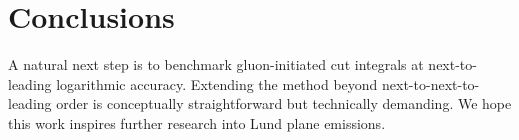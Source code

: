 \section{Conclusions}\label{sec:conclusions}

A natural next step is to benchmark gluon-initiated cut integrals at
next-to-leading logarithmic accuracy. Extending the method beyond
next-to-next-to-leading order is conceptually straightforward but
technically demanding. We hope this work inspires further research into
Lund plane emissions.

